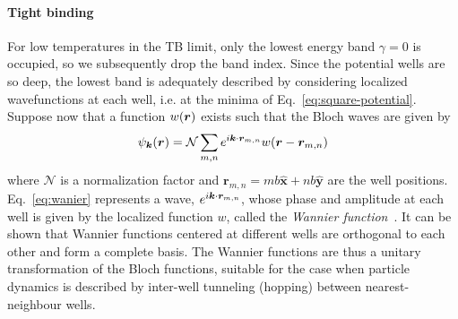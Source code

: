 \paragraph{Tight binding}
For low temperatures in the TB limit, only the lowest energy band
$\gamma = 0$ is occupied, so we subsequently drop the band
index. Since the potential wells are so deep, the lowest band is
adequately described by considering localized wavefunctions at each
well, i.e. at the minima of Eq.~\eqref{eq:square-potential}. Suppose
now that a function $w(\bm{r})$ exists such that the Bloch waves are
given by
%
\begin{equation}\label{eq:wanier}
  \psi_{\bm{k}} (\bm{r}) = \mathcal{N} \sum_{m,n} e^{i\bm{k} \cdot \bm{r}_{m,n}} w(\bm{r} - \bm{r}_{m,n})
\end{equation}
% 
where $\mathcal{N}$ is a normalization factor and
$\bm{r}_{m,n} = m b \hat{\bm{x}} + n b \hat{\bm{y}}$ are the well
positions. Eq.~\eqref{eq:wanier} represents a wave,
$e^{i\bm{k} \cdot \bm{r}_{m,n}}$, whose phase and amplitude at each well is
given by the localized function $w$, called the \textit{Wannier
  function}~\cite{ziman1972principles}. It can be shown that Wannier
functions centered at different wells are orthogonal to each other and
form a complete basis. The Wannier functions are thus a unitary
transformation of the Bloch functions, suitable for the case when
particle dynamics is described by inter-well tunneling (hopping)
between nearest-neighbour wells. 

